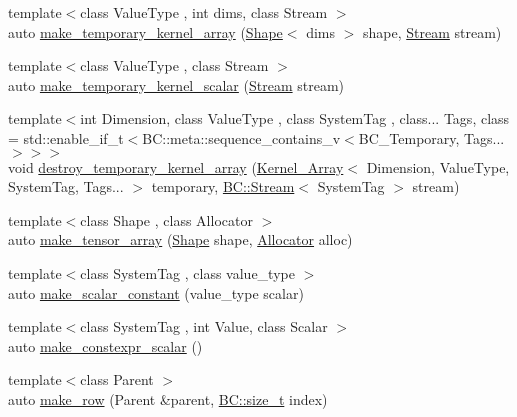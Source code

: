 \begin{DoxyCompactItemize}
\item 
{\footnotesize template$<$class Value\+Type , int dims, class Stream $>$ }\\auto \hyperlink{namespaceBC_1_1tensors_1_1exprs_a16e4cf47041314afaf1aa12777ac78b6}{make\+\_\+temporary\+\_\+kernel\+\_\+array} (\hyperlink{classBC_1_1tensors_1_1exprs_1_1Shape}{Shape}$<$ dims $>$ shape, \hyperlink{namespaceBC_abc64a63cd29a22d102a68f478dfd588d}{Stream} stream)
\item 
{\footnotesize template$<$class Value\+Type , class Stream $>$ }\\auto \hyperlink{namespaceBC_1_1tensors_1_1exprs_ae3b98abe41a14fe0c4d81a2cdcbf252e}{make\+\_\+temporary\+\_\+kernel\+\_\+scalar} (\hyperlink{namespaceBC_abc64a63cd29a22d102a68f478dfd588d}{Stream} stream)
\item 
{\footnotesize template$<$int Dimension, class Value\+Type , class System\+Tag , class... Tags, class  = std\+::enable\+\_\+if\+\_\+t$<$\+B\+C\+::meta\+::sequence\+\_\+contains\+\_\+v$<$\+B\+C\+\_\+\+Temporary, Tags...$>$$>$$>$ }\\void \hyperlink{namespaceBC_1_1tensors_1_1exprs_aad2aca301cfc58f4a3e527177c02e159}{destroy\+\_\+temporary\+\_\+kernel\+\_\+array} (\hyperlink{structBC_1_1tensors_1_1exprs_1_1Kernel__Array}{Kernel\+\_\+\+Array}$<$ Dimension, Value\+Type, System\+Tag, Tags... $>$ temporary, \hyperlink{namespaceBC_abc64a63cd29a22d102a68f478dfd588d}{B\+C\+::\+Stream}$<$ System\+Tag $>$ stream)
\item 
{\footnotesize template$<$class Shape , class Allocator $>$ }\\auto \hyperlink{namespaceBC_1_1tensors_1_1exprs_ac5a39984f442f3604db23867975b96a6}{make\+\_\+tensor\+\_\+array} (\hyperlink{classBC_1_1tensors_1_1exprs_1_1Shape}{Shape} shape, \hyperlink{namespaceBC_a934f94b17b06290e6b241e5f59930c5f}{Allocator} alloc)
\item 
{\footnotesize template$<$class System\+Tag , class value\+\_\+type $>$ }\\auto \hyperlink{namespaceBC_1_1tensors_1_1exprs_ac9a5f6ae08273c75d39f401a296c44ca}{make\+\_\+scalar\+\_\+constant} (value\+\_\+type scalar)
\item 
{\footnotesize template$<$class System\+Tag , int Value, class Scalar $>$ }\\auto \hyperlink{namespaceBC_1_1tensors_1_1exprs_a9e0d5157d6342a05c30f6cfa9fb42c10}{make\+\_\+constexpr\+\_\+scalar} ()
\item 
{\footnotesize template$<$class Parent $>$ }\\auto \hyperlink{namespaceBC_1_1tensors_1_1exprs_ac057fd1d0dcd9f454de5274da35ac452}{make\+\_\+row} (Parent \&parent, \hyperlink{namespaceBC_a6007cbc4eeec401a037b558910a56173}{B\+C\+::size\+\_\+t} index)

\end{DoxyCompactItemize}
